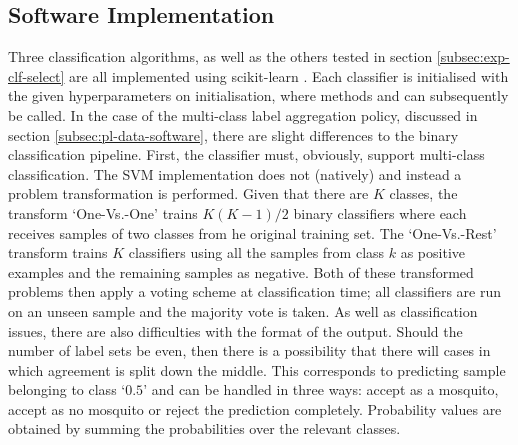     \subsection{Software Implementation}
    \label{subsec:pl-clf-software}
        Three classification algorithms, as well as the others tested in section \ref{subsec:exp-clf-select} are all implemented using scikit-learn \cite{Pedregosa2012}. Each classifier is initialised with the given hyperparameters on  initialisation, where methods  and  can subsequently be called. In the case of the multi-class label aggregation policy, discussed in section \ref{subsec:pl-data-software}, there are slight differences to the binary classification pipeline. First, the classifier must, obviously, support multi-class classification. The SVM implementation does not (natively) and instead a problem transformation is performed. Given that there are $K$ classes, the transform `One-Vs.-One' trains $K(K-1)/2$ binary classifiers where each receives samples of two classes from he original training set. The `One-Vs.-Rest' transform trains $K$ classifiers using all the samples from class $k$ as positive examples and the remaining samples as negative. Both of these transformed problems then apply a voting scheme at classification time; all classifiers are run on an unseen sample and the majority vote is taken. As well as classification issues, there are also difficulties with the format of the output. Should the number of label sets be even, then there is a possibility that there will cases in which agreement is split down the middle. This corresponds to predicting sample belonging to class `$0.5$' and can be handled in three ways: accept as a mosquito, accept as no mosquito or reject the prediction completely. Probability values are obtained by summing the probabilities over the relevant classes.

